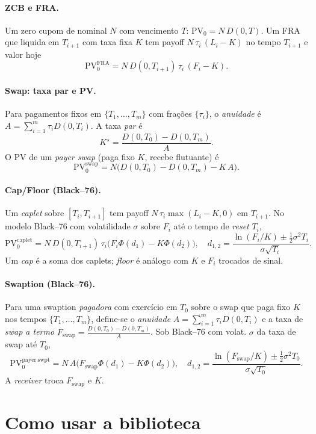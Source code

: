 \documentclass[11pt,a4paper]{article}
\begin{document}
\paragraph{ZCB e FRA.}
Um zero cupom de nominal $N$ com vencimento $T$: $\mathrm{PV}_0 = N\,D(0,T)$.
Um FRA que liquida em $T_{i+1}$ com taxa fixa $K$ tem payoff $N\,\tau_i\,(L_i-K)$ no tempo $T_{i+1}$
e valor hoje
\[
\mathrm{PV}_0^{\mathrm{FRA}} = N\,D(0,T_{i+1})\,\tau_i\,(F_i - K).
\]

\paragraph{Swap: taxa par e PV.}
Para pagamentos fixos em $\{T_1,\dots,T_m\}$ com frações $\{\tau_i\}$, o \emph{anuidade} é $A=\sum_{i=1}^m \tau_i D(0,T_i)$.
A taxa \emph{par} é
\[
K^\star = \frac{D(0,T_0)-D(0,T_m)}{A}.
\]
O PV de um \emph{payer swap} (paga fixo $K$, recebe flutuante) é
\[
\mathrm{PV}_0^{\mathrm{swap}} = N\Big(D(0,T_0)-D(0,T_m) - K\,A\Big).
\]

\paragraph{Cap/Floor (Black--76).}
Um \emph{caplet} sobre $[T_i,T_{i+1}]$ tem payoff $N\,\tau_i \max(L_i-K,0)$ em $T_{i+1}$.
No modelo Black--76 com volatilidade $\sigma$ sobre $F_i$ até o tempo de \emph{reset} $T_i$,
\[
\mathrm{PV}_0^{\mathrm{caplet}} = N\,D(0,T_{i+1})\,\tau_i\big(F_i \Phi(d_1) - K \Phi(d_2)\big),
\quad d_{1,2}=\frac{\ln(F_i/K)\pm \tfrac12 \sigma^2 T_i}{\sigma\sqrt{T_i}}.
\]
Um \emph{cap} é a soma dos caplets; \emph{floor} é análogo com $K$ e $F_i$ trocados de sinal.

\paragraph{Swaption (Black--76).}
Para uma swaption \emph{pagadora} com exercício em $T_0$ sobre o swap que paga fixo $K$
nos tempos $\{T_1,\dots,T_m\}$, define-se o \emph{anuidade} $A=\sum_{i=1}^m \tau_i D(0,T_i)$
e a taxa de \emph{swap a termo} $F_{\mathrm{swap}}=\frac{D(0,T_0)-D(0,T_m)}{A}$.
Sob Black--76 com volat. $\sigma$ da taxa de swap até $T_0$,
\[
\mathrm{PV}_0^{\mathrm{payer\ swpt}} = N\,A\big(F_{\mathrm{swap}}\Phi(d_1) - K \Phi(d_2)\big),
\quad d_{1,2}=\frac{\ln(F_{\mathrm{swap}}/K)\pm \tfrac12 \sigma^2 T_0}{\sigma\sqrt{T_0}}.
\]
A \emph{receiver} troca $F_{\mathrm{swap}}$ e $K$.

\section{Como usar a biblioteca}
\end{document}
